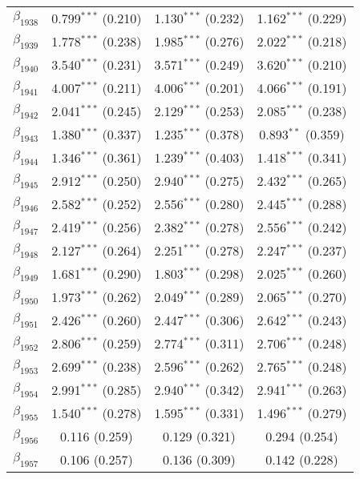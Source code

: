 \begin{table}[!h]
\begin{tabular}{@{\extracolsep{5pt}}lccc}
  $\beta_{1938}$ & 0.799$^{***}$ (0.210) & 1.130$^{***}$ (0.232) & 1.162$^{***}$ (0.229) \\ 
  $\beta_{1939}$ & 1.778$^{***}$ (0.238) & 1.985$^{***}$ (0.276) & 2.022$^{***}$ (0.218) \\ 
  $\beta_{1940}$ & 3.540$^{***}$ (0.231) & 3.571$^{***}$ (0.249) & 3.620$^{***}$ (0.210) \\ 
  $\beta_{1941}$ & 4.007$^{***}$ (0.211) & 4.006$^{***}$ (0.201) & 4.066$^{***}$ (0.191) \\ 
  $\beta_{1942}$ & 2.041$^{***}$ (0.245) & 2.129$^{***}$ (0.253) & 2.085$^{***}$ (0.238) \\ 
  $\beta_{1943}$ & 1.380$^{***}$ (0.337) & 1.235$^{***}$ (0.378) & 0.893$^{**}$ (0.359) \\ 
  $\beta_{1944}$ & 1.346$^{***}$ (0.361) & 1.239$^{***}$ (0.403) & 1.418$^{***}$ (0.341) \\ 
  $\beta_{1945}$ & 2.912$^{***}$ (0.250) & 2.940$^{***}$ (0.275) & 2.432$^{***}$ (0.265) \\ 
  $\beta_{1946}$ & 2.582$^{***}$ (0.252) & 2.556$^{***}$ (0.280) & 2.445$^{***}$ (0.288) \\ 
  $\beta_{1947}$ & 2.419$^{***}$ (0.256) & 2.382$^{***}$ (0.278) & 2.556$^{***}$ (0.242) \\ 
  $\beta_{1948}$ & 2.127$^{***}$ (0.264) & 2.251$^{***}$ (0.278) & 2.247$^{***}$ (0.237) \\ 
  $\beta_{1949}$ & 1.681$^{***}$ (0.290) & 1.803$^{***}$ (0.298) & 2.025$^{***}$ (0.260) \\ 
  $\beta_{1950}$ & 1.973$^{***}$ (0.262) & 2.049$^{***}$ (0.289) & 2.065$^{***}$ (0.270) \\ 
  $\beta_{1951}$ & 2.426$^{***}$ (0.260) & 2.447$^{***}$ (0.306) & 2.642$^{***}$ (0.243) \\ 
  $\beta_{1952}$ & 2.806$^{***}$ (0.259) & 2.774$^{***}$ (0.311) & 2.706$^{***}$ (0.248) \\ 
  $\beta_{1953}$ & 2.699$^{***}$ (0.238) & 2.596$^{***}$ (0.262) & 2.765$^{***}$ (0.248) \\ 
  $\beta_{1954}$ & 2.991$^{***}$ (0.285) & 2.940$^{***}$ (0.342) & 2.941$^{***}$ (0.263) \\ 
  $\beta_{1955}$ & 1.540$^{***}$ (0.278) & 1.595$^{***}$ (0.331) & 1.496$^{***}$ (0.279) \\ 
  $\beta_{1956}$ & 0.116 (0.259) & 0.129 (0.321) & 0.294 (0.254) \\ 
  $\beta_{1957}$ & 0.106 (0.257) & 0.136 (0.309) & 0.142 (0.228) \\ 

\end{tabular}
\end{table}
